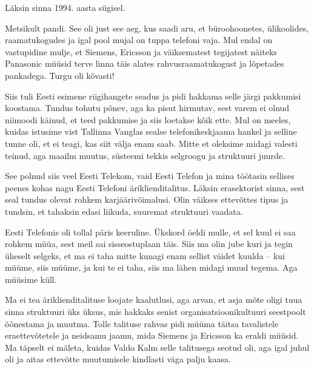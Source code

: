 Läksin sinna 1994. aasta sügisel. 


Metsikult pandi. See oli just see aeg, kus saadi aru, et büroohoonetes, 
ülikoolides, raamatukogudes ja igal pool mujal on tuppa telefoni vaja. 
Mul endal on vastupidine mulje, et Siemens, Ericsson ja 
väiksematest tegijatest näiteks Panasonic 
müüsid terve linna täis alates rahvusraamatukogust ja lõpetades 
pankadega. Turgu oli kõvasti! 

Siis tuli Eesti esimene riigihangete seadus ja
pidi hakkama selle järgi pakkumisi koostama. Tundus tohutu põnev, aga ka pisut 
hirmutav, sest varem ei olnud niimoodi käinud, et teed pakkumise ja siis 
loetakse kõik ette. Mul on meeles, kuidas istusime vist Tallinna Vanglas sealse  
telefonikeskjaama hankel ja selline tunne oli, et ei teagi, kas siit välja enam 
saab. Mitte et oleksime midagi valesti teinud, 
aga maailm muutus, süsteemi tekkis selgroogu ja struktuuri 
juurde.


See polnud siis veel Eesti Telekom, vaid Eesti Telefon ja 
mina töötasin sellises peenes kohas nagu Eesti Telefoni äriklienditalitus. Läksin erasektorist sinna, sest seal tundus 
olevat rohkem karjäärivõimalusi. Olin väikses ettevõttes tipus ja tundsin, et 
tahaksin edasi liikuda, suuremat struktuuri vaadata. 

Eesti Telefonis oli tollal päris keeruline. Ükskord öeldi mulle, et sel kuul ei saa rohkem müüa, sest meil sai 
sisseostuplaan täis. Siis ma olin jube kuri ja tegin üheselt selgeks, et ma ei 
taha mitte kunagi enam sellist väidet kuulda -- kui müüme, siis müüme, ja 
kui te ei taha, siis ma lähen midagi muud tegema. Aga müüsime küll.


Ma ei tea äriklienditalituse loojate kaalutlusi, aga arvan, et asja 
mõte oligi tuua sinna struktuuri üks üksus, mis hakkaks senist organisatsioonikultuuri seestpoolt õõnestama ja muutma. 
Tolle talituse rahvas pidi müüma täitsa tavalistele eraettevõtetele ja 
 neidsamu jaamu, mida Siemens ja Ericsson ka eraldi müüsid. Ma täpselt ei mäleta, kuidas Valdo Kalm selle 
talitusega seotud oli, aga igal juhul oli ja aitas
ettevõtte muutumisele kindlasti väga palju kaasa. 

